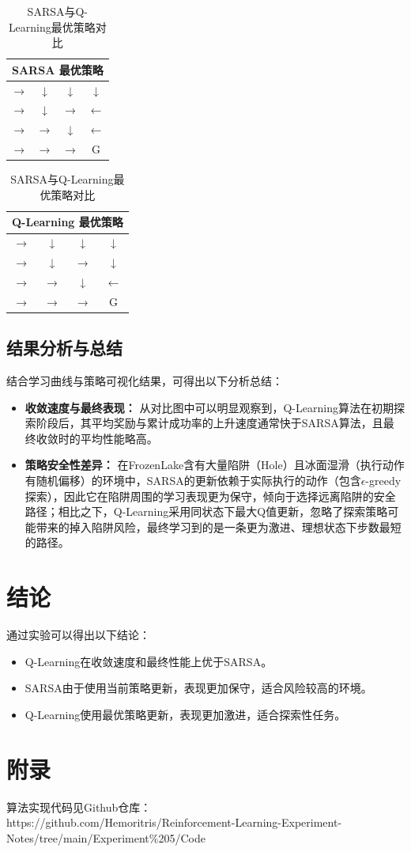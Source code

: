 \documentclass[12pt]{article}
\begin{document}
\begin{table}[h!]
    \centering
    \begin{tabular}{|c|c|c|c|}
        \hline
        \multicolumn{4}{|c|}{SARSA 最优策略} \\ \hline
        → & ↓ & ↓ & ↓ \\ \hline
        → & ↓ & → & ← \\ \hline
        → & → & ↓ & ← \\ \hline
        → & → & → & G \\ \hline
    \end{tabular}
    \quad
    \begin{tabular}{|c|c|c|c|}
        \hline
        \multicolumn{4}{|c|}{Q-Learning 最优策略} \\ \hline
        → & ↓ & ↓ & ↓ \\ \hline
        → & ↓ & → & ↓ \\ \hline
        → & → & ↓ & ← \\ \hline
        → & → & → & G \\ \hline
    \end{tabular}
    \caption{SARSA与Q-Learning最优策略对比}
    \label{tab:policy}
\end{table}

\subsection{结果分析与总结}
结合学习曲线与策略可视化结果，可得出以下分析总结：
\begin{itemize}
    \item \textbf{收敛速度与最终表现：} 从对比图中可以明显观察到，Q-Learning算法在初期探索阶段后，其平均奖励与累计成功率的上升速度通常快于SARSA算法，且最终收敛时的平均性能略高。
    \item \textbf{策略安全性差异：} 在FrozenLake含有大量陷阱（Hole）且冰面湿滑（执行动作有随机偏移）的环境中，SARSA的更新依赖于实际执行的动作（包含$\epsilon$-greedy探索），因此它在陷阱周围的学习表现更为保守，倾向于选择远离陷阱的安全路径；相比之下，Q-Learning采用同状态下最大Q值更新，忽略了探索策略可能带来的掉入陷阱风险，最终学习到的是一条更为激进、理想状态下步数最短的路径。
\end{itemize}

\section{结论}
通过实验可以得出以下结论：
\begin{itemize}
    \item Q-Learning在收敛速度和最终性能上优于SARSA。
    \item SARSA由于使用当前策略更新，表现更加保守，适合风险较高的环境。
    \item Q-Learning使用最优策略更新，表现更加激进，适合探索性任务。
\end{itemize}

\section{附录}
算法实现代码见Github仓库： \\
https://github.com/Hemoritris/Reinforcement-Learning-Experiment-Notes/tree/main/Experiment\%205/Code
\end{document}
